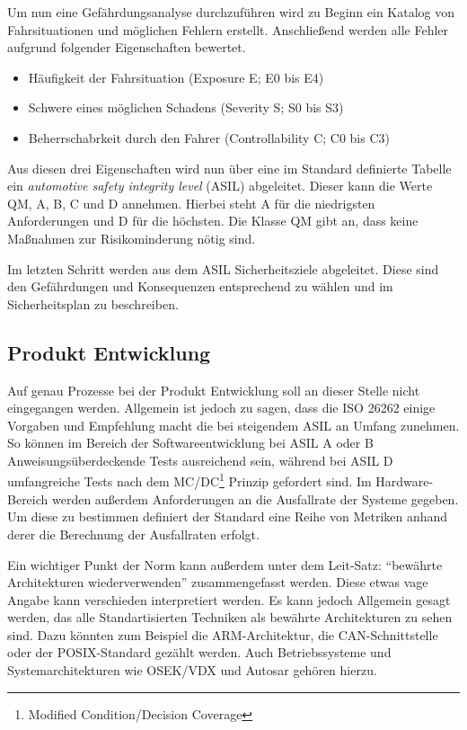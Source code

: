 \documentclass[
  a4paper,					    %
  twoside,
  DIV=calc,     				%
  bibliography=totoc,
  cleardoublepage=empty,
  ngerman,     					%
  final       					%
]{scrbook}
\begin{document}
Um nun eine Gefährdungsanalyse durchzuführen wird zu Beginn ein Katalog von Fahrsituationen und möglichen Fehlern erstellt. Anschließend werden alle Fehler aufgrund folgender Eigenschaften bewertet.

\begin{itemize}
    \item Häufigkeit der Fahrsituation (Exposure E; E0 bis E4)
    \item Schwere eines möglichen Schadens (Severity S; S0 bis S3)
    \item Beherrschabrkeit durch den Fahrer (Controllability C; C0 bis C3)
\end{itemize}

Aus diesen drei Eigenschaften wird nun über eine im Standard definierte Tabelle ein \emph{automotive safety integrity level} (ASIL) abgeleitet. Dieser kann die Werte QM, A, B, C und D annehmen. Hierbei steht A für die niedrigsten Anforderungen und D für die höchsten. Die Klasse QM gibt an, dass keine Maßnahmen zur Risikominderung nötig sind.

Im letzten Schritt werden aus dem ASIL Sicherheitsziele abgeleitet. Diese sind den Gefährdungen und Konsequenzen entsprechend zu wählen und im Sicherheitsplan zu beschreiben.


\subsection{Produkt Entwicklung}
\label{sec:ISO26262_produkt_entwicklung}
Auf genau Prozesse bei der Produkt Entwicklung soll an dieser Stelle nicht eingegangen werden. Allgemein ist jedoch zu sagen, dass die ISO 26262 einige Vorgaben und Empfehlung macht die bei steigendem ASIL an Umfang zunehmen. So können im Bereich der Softwareentwicklung bei ASIL A oder B Anweisungsüberdeckende Tests ausreichend sein, während bei ASIL D umfangreiche Tests nach dem MC/DC\footnote{Modified Condition/Decision Coverage} Prinzip gefordert sind. Im Hardware-Bereich werden außerdem Anforderungen an die Ausfallrate der Systeme gegeben. Um diese zu bestimmen definiert der Standard eine Reihe von Metriken anhand derer die Berechnung der Ausfallraten erfolgt.

Ein wichtiger Punkt der Norm kann außerdem unter dem Leit-Satz: "`bewährte Architekturen wiederverwenden"' zusammengefasst werden. Diese etwas vage Angabe kann verschieden interpretiert werden. Es kann jedoch Allgemein gesagt werden, das alle Standartisierten Techniken als bewährte Architekturen zu sehen sind. Dazu könnten zum Beispiel die ARM-Architektur, die CAN-Schnittstelle oder der POSIX-Standard gezählt werden. Auch Betriebssysteme und Systemarchitekturen wie OSEK/VDX und Autosar gehören hierzu.
\end{document}
